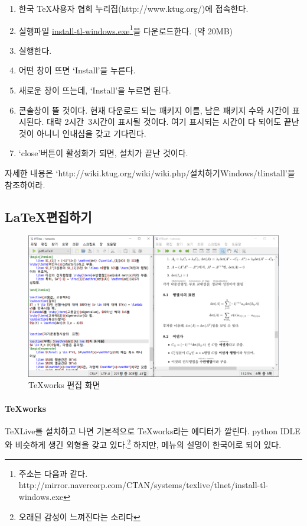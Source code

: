 \documentclass[chapter, oneside]{oblivoir}
\begin{document}
\begin{enumerate}
\item 한국 \TeX 사용자 협회 누리집(http://www.ktug.org/)에 접속한다.
\item 실행파일 \href{http://mirror.navercorp.com/CTAN/systems/texlive/tlnet/install-tl-windows.exe}{install-tl-windows.exe}\footnote{주소는 다음과 같다. http://mirror.navercorp.com/CTAN/systems/texlive/tlnet/install-tl-windows.exe}을 다운로드한다. (약 20MB)
\item 실행한다.
\item 어떤 창이 뜨면 `Install'을 누른다.
\item 새로운 창이 뜨는데, `Install'을 누르면 된다.
\item 콘솔창이 뜰 것이다. 현재 다운로드 되는 패키지 이름, 남은 패키지 수와 시간이 표시된다. 대략 2시간~3시간이 표시될 것이다. 여기 표시되는 시간이 다 되어도 끝난 것이 아니니 인내심을 갖고 기다린다.
\item `close'버튼이 활성화가 되면, 설치가 끝난 것이다.
\end{enumerate}

자세한 내용은 `http://wiki.ktug.org/wiki/wiki.php/설치하기Windows/tlinstall'을 참조하여라.

\subsection{\LaTeX 편집하기}
\begin{figure}[h!]
\centering
\includegraphics[width=.7\textwidth]{img/5/texlive_edit.png}
\caption{TeXworks 편집 화면}
\label{texlive:exdit}
\end{figure}

\paragraph{TeXworks}
TeXLive를 설치하고 나면 기본적으로 TeXworks라는 에디터가 깔린다. python IDLE와 비슷하게 생긴 외형을 갖고 있다.\footnote{오래된 감성이 느껴진다는 소리다}
하지만, 메뉴의 설명이 한국어로 되어 있다.
\end{document}
